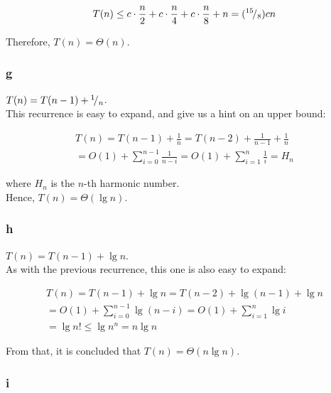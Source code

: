 \documentclass[8pt,a4paper]{article}
\begin{document}
\begin{equation*}
  T(n) \leq c \cdot \frac{n}{2} + c \cdot \frac{n}{4} + c \cdot \frac{n}{8} + n
  = ({}^{15}\!/_{8})c n
\end{equation*}

  Therefore, $T(n) = \Theta(n)$.

\subsubsection*{g}

$T(n) = T(n - 1) + {}^{1}\!/_{n}$. \\

  This recurrence is easy to expand, and give us a hint on an upper bound:

\begin{equation*}
  \begin{split}
    T(n) = T(n - 1) + \frac{1}{n} = T(n - 2) + \frac{1}{n - 1} + \frac{1}{n} \\
    = O(1) + \sum\limits_{i = 0}^{n - 1} \frac{1}{n - i}
    = O(1) + \sum\limits_{i = 1}^{n} \frac{1}{i} = H_{n}
  \end{split}
\end{equation*}

  where $H_{n}$ is the $n$-th harmonic number. \\

 Hence, $T(n) = \Theta(\lg n)$.

\subsubsection*{h}

$T(n) = T(n - 1) + \lg n$. \\

  As with the previous recurrence, this one is also easy to expand:

\begin{equation*}
  \begin{split}
    T(n) = T(n - 1) + \lg n = T(n - 2) + \lg(n - 1) + \lg n \\
    = O(1) + \sum\limits_{i = 0}^{n - 1} \lg (n - i)
    = O(1) + \sum\limits_{i = 1}^{n} \lg i \\
    = \lg n! \leq \lg n^{n} = n \lg n
  \end{split}
\end{equation*}

  From that, it is concluded that $T(n) = \Theta(n \lg n)$.

\subsubsection*{i}
\end{document}
